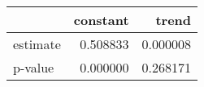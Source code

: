 \begin{tabular}{lrr}
\toprule
{} &  constant &     trend \\
\midrule
estimate &  0.508833 &  0.000008 \\
p-value  &  0.000000 &  0.268171 \\
\bottomrule
\end{tabular}

